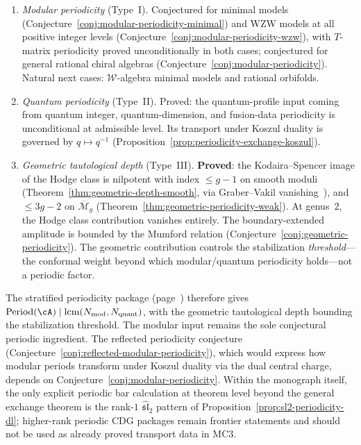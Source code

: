 \begin{enumerate}[label=\textup{(\alph*)}]
\item \emph{Modular periodicity} (Type~I).  Conjectured for minimal
  models (Conjecture~\ref{conj:modular-periodicity-minimal}) and WZW
  models at all positive integer levels
  (Conjecture~\ref{conj:modular-periodicity-wzw}), with $T$-matrix
  periodicity proved unconditionally in both cases; conjectured for
  general rational chiral algebras
  (Conjecture~\ref{conj:modular-periodicity}).  Natural next cases:
  $\mathcal{W}$-algebra minimal models and rational orbifolds.
\item \emph{Quantum periodicity} (Type~II).
  Proved: the quantum-profile input coming from quantum integer,
  quantum-dimension, and fusion-data periodicity is unconditional at
  admissible level.  Its transport under Koszul duality is governed by
  $q \mapsto q^{-1}$
  (Proposition~\ref{prop:periodicity-exchange-koszul}).
\item \emph{Geometric tautological depth} (Type~III).
  \textbf{Proved}: the Kodaira--Spencer image of the Hodge class is
  nilpotent with index $\leq g - 1$ on smooth moduli
  (Theorem~\ref{thm:geometric-depth-smooth}, via Graber--Vakil
  vanishing~\cite{GraVak05}), and $\leq 3g - 2$ on
  $\overline{\mathcal{M}}_g$
  (Theorem~\ref{thm:geometric-periodicity-weak}).  At genus~$2$, the
  Hodge class contribution vanishes entirely.  The boundary-extended
  amplitude is bounded by the Mumford relation
  (Conjecture~\ref{conj:geometric-periodicity}).  The geometric
  contribution controls the stabilization \emph{threshold}---the
  conformal weight beyond which modular/quantum periodicity holds---not
  a periodic factor.
\end{enumerate}
The stratified periodicity package
(page~\pageref{conj:complete-periodicity-classification}) therefore
gives
$\mathrm{Period}(\cA) \mid \mathrm{lcm}(N_{\mathrm{mod}},
N_{\mathrm{quant}})$, with the geometric tautological depth
bounding the stabilization threshold.  The modular input remains the
sole conjectural periodic ingredient.
The reflected periodicity conjecture
(Conjecture~\ref{conj:reflected-modular-periodicity}), which
would express how modular periods transform under Koszul duality
via the dual central charge, depends on
Conjecture~\ref{conj:modular-periodicity}.
Within the monograph itself, the only explicit periodic bar calculation
at theorem level beyond the general exchange theorem is the rank-$1$
$\widehat{\mathfrak{sl}}_2$ pattern of
Proposition~\ref{prop:sl2-periodicity-dl}; higher-rank periodic CDG
packages remain frontier statements and should not be used as already
proved transport data in MC3.

